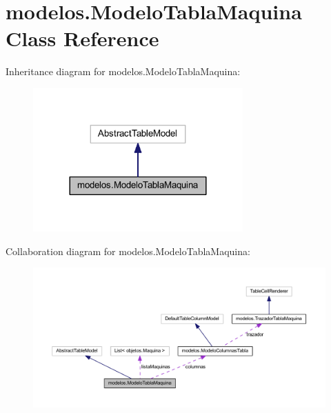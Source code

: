 \hypertarget{classmodelos_1_1_modelo_tabla_maquina}{}\section{modelos.\+Modelo\+Tabla\+Maquina Class Reference}
\label{classmodelos_1_1_modelo_tabla_maquina}


Inheritance diagram for modelos.\+Modelo\+Tabla\+Maquina\+:
\nopagebreak
\begin{figure}[H]
\begin{center}
\leavevmode
\includegraphics[width=228pt]{classmodelos_1_1_modelo_tabla_maquina__inherit__graph}
\end{center}
\end{figure}


Collaboration diagram for modelos.\+Modelo\+Tabla\+Maquina\+:
\nopagebreak
\begin{figure}[H]
\begin{center}
\leavevmode
\includegraphics[width=350pt]{classmodelos_1_1_modelo_tabla_maquina__coll__graph}
\end{center}
\end{figure}

